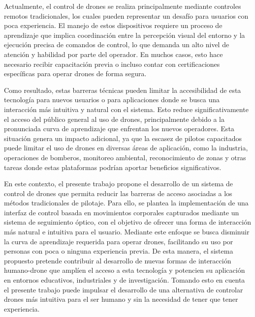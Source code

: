 Actualmente, el control de drones se realiza principalmente mediante controles remotos tradicionales, los cuales pueden representar un desafío para usuarios con poca experiencia. El manejo de estos dispositivos requiere un proceso de aprendizaje que implica coordinación entre la percepción visual del entorno y la ejecución precisa de comandos de control, lo que demanda un alto nivel de atención y habilidad por parte del operador. En muchos casos, esto hace necesario recibir capacitación previa o incluso contar con certificaciones específicas para operar drones de forma segura.

Como resultado, estas barreras técnicas pueden limitar la accesibilidad de esta tecnología para nuevos usuarios o para aplicaciones donde se busca una interacción más intuitiva y natural con el sistema. Esto reduce significativamente el acceso del público general al uso de drones, principalmente debido a la pronunciada curva de aprendizaje que enfrentan los nuevos operadores. Esta situación genera un impacto adicional, ya que la escasez de pilotos capacitados puede limitar el uso de drones en diversas áreas de aplicación, como la industria, operaciones de bomberos, monitoreo ambiental, reconocimiento de zonas y otras tareas donde estas plataformas podrían aportar beneficios significativos.

En este contexto, el presente trabajo propone el desarrollo de un sistema de control de drones que permita reducir las barreras de acceso asociadas a los métodos tradicionales de pilotaje. Para ello, se plantea la implementación de una interfaz de control basada en movimientos corporales capturados mediante un sistema de seguimiento óptico, con el objetivo de ofrecer una forma de interacción más natural e intuitiva para el usuario. Mediante este enfoque se busca disminuir la curva de aprendizaje requerida para operar drones, facilitando su uso por personas con poca o ninguna experiencia previa. De esta manera, el sistema propuesto pretende contribuir al desarrollo de nuevas formas de interacción humano-drone que amplíen el acceso a esta tecnología y potencien su aplicación en entornos educativos, industriales y de investigación. Tomando esto en cuenta el presente trabajo puede impulsar el desarrollo de una alternativa de controlar drones más intuitiva para el ser humano y sin la necesidad de tener que tener experiencia.
